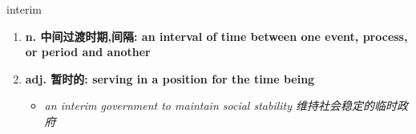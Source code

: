 
\begin{frame}
{\huge interim}
\begin{center}
\begin{enumerate}\Large
  \item \textbf{n. 中间过渡时期,间隔: an interval of time between one event, process, or period and another}
  \item \textbf{adj. 暂时的: serving in a position for the time being}
  \begin{itemize}
    \item \em{\Large{an interim government to maintain social stability 维持社会稳定的临时政府}}
  \end{itemize}
\end{enumerate}
\end{center}
\end{frame}
